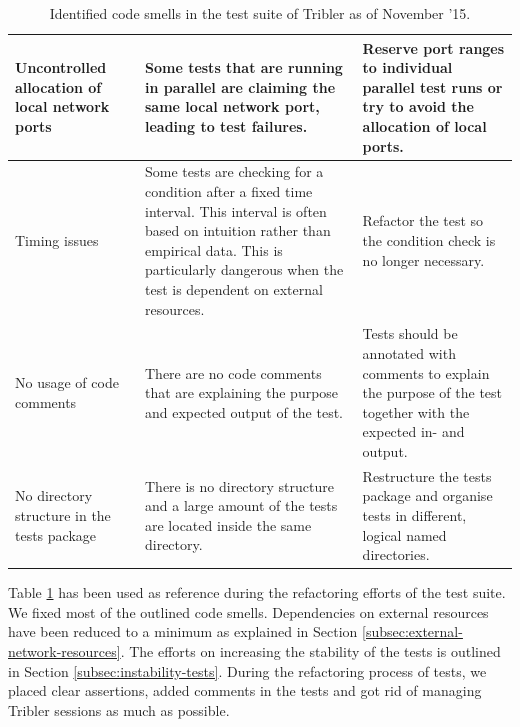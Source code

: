 \begin{table}
\begin{tabularx}{\textwidth}{|X|X|X|}
		Uncontrolled allocation of local network ports & Some tests that are running in parallel are claiming the same local network port, leading to test failures. & Reserve port ranges to individual parallel test runs or try to avoid the allocation of local ports. \\ \hline
		Timing issues & Some tests are checking for a condition after a fixed time interval. This interval is often based on intuition rather than empirical data. This is particularly dangerous when the test is dependent on external resources. & Refactor the test so the condition check is no longer necessary.\\ \hline
		No usage of code comments & There are no code comments that are explaining the purpose and expected output of the test. & Tests should be annotated with comments to explain the purpose of the test together with the expected in- and output. \\ \hline
		No directory structure in the tests package & There is no directory structure and a large amount of the tests are located inside the same directory. & Restructure the tests package and organise tests in different, logical named directories.\\ \hline
	\end{tabularx}
	\caption{Identified code smells in the test suite of Tribler as of November '15.}
	\label{table:tests-code-smells}
\end{table}

\noindent Table \ref{table:tests-code-smells} has been used as reference during the refactoring efforts of the test suite. We fixed most of the outlined code smells. Dependencies on external resources have been reduced to a minimum as explained in Section \ref{subsec:external-network-resources}. The efforts on increasing the stability of the tests is outlined in Section \ref{subsec:instability-tests}. During the refactoring process of tests, we placed clear assertions, added comments in the tests and got rid of managing Tribler sessions as much as possible.

